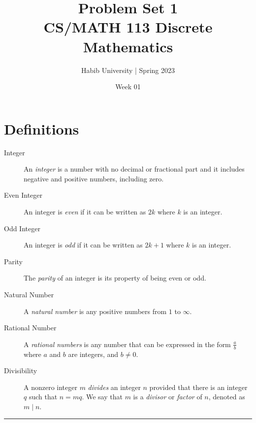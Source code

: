\documentclass{exam}
\begin{document}
\title{Problem Set 1\\ CS/MATH 113 Discrete Mathematics}
\author{Habib University | Spring 2023}
\date{Week 01}
\maketitle

\section*{Definitions}
\begin{description}
\item [Integer]
  An \textit{integer} is a number with no decimal or fractional part and it includes negative and positive numbers, including zero.
\item[Even Integer]
  An integer is \textit{even} if it can be written as $2k$ where $k$ is an integer.
\item[Odd Integer]
  An integer is \textit{odd} if it can be written as $2k+1$ where $k$ is an integer.
\item[Parity]
  The \textit{parity} of an integer is its property of being even or odd.
\item[Natural Number]
  A \textit{natural number} is any positive numbers from $1$ to $\infty$.
\item[Rational Number]
  A \textit{rational numbers} is any number that can be expressed in the form $\frac{a}{b}$ where $a$ and $b$ are integers, and $b \neq  0$.
\item[Divisibility]
  A nonzero integer $m$ \textit{divides} an integer $n$ provided that there is an integer $q$ such that $n=mq$. We say that $m$ is a \textit{divisor} or \textit{factor} of $n$, denoted as $ m \mid n$.
\end{description}

\hrule
\end{document}
